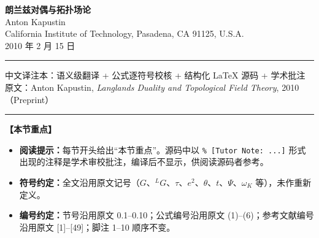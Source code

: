 \documentclass[11pt,a4paper,UTF8]{ctexart}
\newenvironment{keypoints}{%
  \par\addvspace{0.9em}%
  \noindent{\color{black!80}\rule{\linewidth}{0.6pt}}\par\nopagebreak\vspace{2pt}%
  \noindent\textbf{【本节重点】}\par\nopagebreak\vspace{2pt}%
  \begin{itemize}[leftmargin=1.6em,itemsep=1pt,topsep=2pt,parsep=0pt]%
}{%
  \end{itemize}\vspace{1pt}\noindent{\color{black!80}\rule{\linewidth}{0.6pt}}\par\addvspace{0.9em}%
}
\begin{document}
\begin{center}
  {\LARGE\bfseries 朗兰兹对偶与拓扑场论}\\[0.6em]
  {\large Anton Kapustin}\\[0.3em]
  {\normalsize California Institute of Technology, Pasadena, CA 91125, U.S.A.}\\[0.3em]
  {\normalsize 2010 年 2 月 15 日}
\end{center}

\vspace{0.4em}
\noindent\rule{\linewidth}{0.4pt}
\begin{center}
  \small 中文译注本：语义级翻译 + 公式逐符号校核 + 结构化 \LaTeX{} 源码 + 学术批注\\
  \small 原文：Anton Kapustin, \emph{Langlands Duality and Topological Field Theory}, 2010（Preprint）
\end{center}
\noindent\rule{\linewidth}{0.4pt}

\vspace{0.6em}
\begin{keypoints}
    \item \textbf{阅读提示：}每节开头给出“本节重点”。源码中以 \verb|% [Tutor Note: ...]| 形式出现的注释是学术审校批注，编译后不显示，供阅读源码者参考。
    \item \textbf{符号约定：}全文沿用原文记号（$G$、${}^{L}G$、$\tau$、$e^{2}$、$\theta$、$t$、$\Psi$、$\omega_{K}$ 等），未作重新定义。
    \item \textbf{编号约定：}节号沿用原文 0.1–0.10；公式编号沿用原文 (1)–(6)；参考文献编号沿用原文 [1]–[49]；脚注 1–10 顺序不变。
\end{keypoints}


\clearpage

\end{document}
